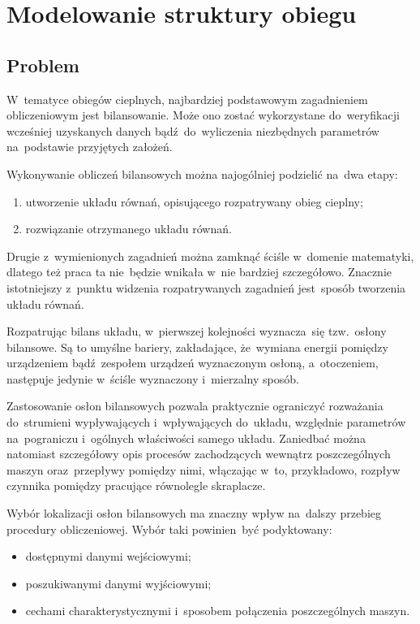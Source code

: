 \section{Modelowanie struktury obiegu}

\subsection{Problem}

W~tematyce obiegów cieplnych, najbardziej podstawowym zagadnieniem
obliczeniowym jest bilansowanie. Może ono zostać wykorzystane
do~weryfikacji wcześniej uzyskanych danych bądź~do~wyliczenia
niezbędnych parametrów na~podstawie przyjętych założeń.

Wykonywanie obliczeń bilansowych można najogólniej podzielić na~dwa
etapy:

\begin{enumerate}

\item utworzenie układu równań, opisującego rozpatrywany obieg cieplny;

\item rozwiązanie otrzymanego układu równań.

\end{enumerate}

Drugie z~wymienionych zagadnień można zamknąć ściśle w~domenie
matematyki, dlatego też praca ta nie~będzie wnikała w~nie bardziej
szczegółowo. Znacznie istotniejszy z~punktu widzenia rozpatrywanych
zagadnień jest~sposób tworzenia układu równań.

Rozpatrując bilans układu, w~pierwszej kolejności wyznacza~się
tzw.~osłony bilansowe. Są to umyślne bariery, zakładające, że~wymiana
energii pomiędzy urządzeniem bądź~zespołem urządzeń wyznaczonym osłoną,
a~otoczeniem, następuje jedynie w~ściśle wyznaczony i~mierzalny sposób.

Zastosowanie osłon bilansowych pozwala praktycznie ograniczyć rozważania
do~strumieni wypływających i~wpływających do~układu, względnie
parametrów na~pograniczu i~ogólnych właściwości samego układu. Zaniedbać
można natomiast szczegółowy opis procesów zachodzących wewnątrz
poszczególnych maszyn oraz~przepływy pomiędzy nimi, włączając w~to,
przykładowo, rozpływ czynnika pomiędzy pracujące równolegle skraplacze.

Wybór lokalizacji osłon bilansowych ma znaczny wpływ na~dalszy przebieg
procedury obliczeniowej. Wybór taki powinien~być podyktowany:

\begin{itemize}

\item dostępnymi danymi wejściowymi;

\item poszukiwanymi danymi wyjściowymi;

\item cechami charakterystycznymi i~sposobem połączenia poszczególnych
	maszyn.

\end{itemize}

